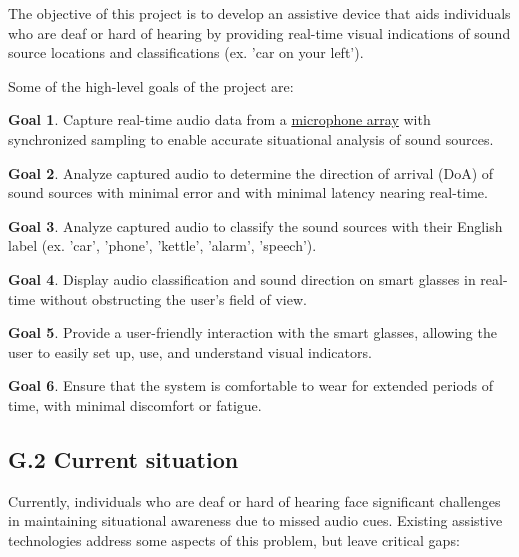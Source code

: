 \documentclass[12pt]{article}
\theoremstyle{definition}
\newtheorem{goal}{Goal}
\begin{document}
The objective of this project is to develop an assistive device that aids
individuals who are deaf or hard of hearing by providing real-time visual
indications of sound source locations and classifications (ex. 'car on your
left').

Some of the high-level goals of the project are:

\begin{goal}\label{goal:audio_capture} Capture real-time audio data from a 
\hyperref[def:microphone_array]{microphone array}
with synchronized sampling to enable accurate situational analysis of sound
sources.
\end{goal}

\begin{goal}\label{goal:audio_direction_analysis} Analyze captured audio to
determine the direction of arrival (DoA) of sound sources with minimal error and
with minimal latency nearing real-time.
\end{goal}

\begin{goal}\label{goal:audio_identification_analysis} Analyze captured audio to
classify the sound sources with their English label (ex. 'car', 'phone',
'kettle', 'alarm', 'speech').
\end{goal}

\begin{goal}\label{goal:visual_display} Display audio classification and sound
direction on smart glasses in real-time without obstructing the user's field of
view.
\end{goal}

\begin{goal}\label{goal:user_friendly_interaction} Provide a user-friendly
interaction with the smart glasses, allowing the user to easily set up, use, and
understand visual indicators.
\end{goal}

\begin{goal}\label{goal:user_comfort} Ensure that the system is comfortable to
wear for extended periods of time, with minimal discomfort or fatigue.
\end{goal}
    
\subsection{G.2 Current situation}

Currently, individuals who are deaf or hard of hearing face significant
challenges in maintaining situational awareness due to missed audio cues.
Existing assistive technologies address some aspects of this problem, but leave
critical gaps:
\end{document}
